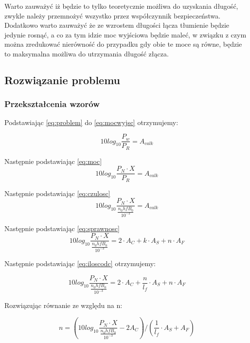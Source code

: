 \documentclass[paper=a4, fontsize=11pt]{scrartcl} %
\numberwithin{equation}{section} %
\numberwithin{figure}{section} %
\numberwithin{table}{section} %
\begin{document}
Warto zauważyć iż będzie to tylko teoretycznie możliwa do uzyskania długość, zwykle należy przemnożyć wszystko przez
współczynnik bezpieczeństwa. Dodatkowo warto zauważyć że ze wzrostem długości łącza tłumienie będzie jedynie rosnąć, 
a co za tym idzie moc wyjściowa będzie maleć, w związku z czym można zredukować nierówność do przypadku gdy obie te moce są
równe, będzie to maksymalna możliwa do utrzymania długość złącza.

\subsection {Rozwiązanie problemu}

\subsubsection { Przekształcenia wzorów }

Podstawiając \eqref{eq:problem}  do \eqref{eq:mocwyjsc} otrzymujemy:

\begin{equation} 
  10log_{10}\frac{P_w}{P_R} = A_{calk}
\end{equation}

Następnie podstawiając \eqref{eq:moc}
\begin{equation} 
  10log_{10}\frac{P_N \cdot X}{P_R} = A_{calk}
\end{equation}

Następnie podstawiając \eqref{eq:czulosc}
\begin{equation} 
  10log_{10}\frac{P_N \cdot X}{\frac{n_0hfB_0}{10^{-3}}} = A_{calk}
\end{equation}

Następnie podstawiając \eqref{eq:sprawnosc}
\begin{equation} 
  10log_{10}\frac{P_N \cdot X}{\frac{n_0hfB_0}{10^{-3}}} = 2\cdot A_C + k \cdot A_S + n \cdot A_F
\end{equation}


Następnie podstawiając \eqref{eq:iloscodc} otrzymujemy: 

\begin{equation} 
  10log_{10}\frac{P_N \cdot X}{\frac{n_0hfB_0}{10^{-3}}} = 2\cdot A_C + \frac{n}{l_f} \cdot A_S + n \cdot A_F
\end{equation}

Rozwiązując równanie ze względu na n:
  
\begin{equation} \label{eq:final}
  n = ( 10log_{10}\frac{P_N \cdot X}{\frac{n_0hfB_0}{10^{-3}}} - 2A_C ) / (\frac{1}{l_f} \cdot A_S +  A_F)
\end{equation}
\end{document}
